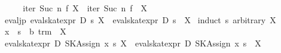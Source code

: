 \begin{isabellebody}
\ \ \isamarkupfalse%
\ \isamarkupfalse%
\ {}iter\ {}Suc\ n{}\ f\ {}{}X{}\ {}\ {}iter\ {}Suc\ n{}\ f\ {}\ X{}\ \isamarkupfalse%
\isanewline
{}\isamarkupfalse%
%
\endisatagproof
{\isafoldproof}%
%
\isadelimproof
\isanewline
%
\endisadelimproof
\isanewline
{}\isamarkupfalse%
\ eval{}jp{}\ {}eval{}skat{}expr\ D\ s\ {}{}X{}\ {}\ {}{}eval{}skat{}expr\ D\ s\ {}\ X{}{}\isanewline
%
\isadelimproof
%
\endisadelimproof
%
\isatagproof
{}\isamarkupfalse%
\ {}induct\ s\ arbitrary{}\ X{}\isanewline
\ \ \isamarkupfalse%
\ x\ \ s\ {}{}\ {}{}b\ trm{}\ \ X\isanewline
\ \ \isamarkupfalse%
\ {}eval{}skat{}expr\ D\ {}SKAssign\ x\ s{}\ {}{}X{}\ {}\ {}eval{}skat{}expr\ D\ {}SKAssign\ x\ s{}\ {}\ X{}\isanewline

\end{isabellebody}
